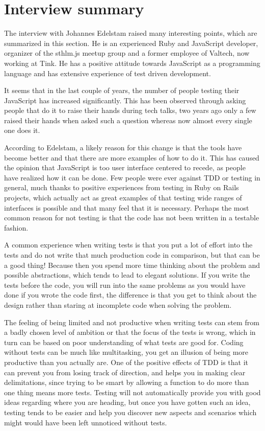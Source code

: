 \documentclass[11pt]{article}
\begin{document}
\section{Interview summary}

The interview with Johannes Edelstam raised many interesting points, which are summarized in this section. He is an experienced Ruby and JavaScript developer, organizer of the sthlm.js meetup group and a former employee of Valtech, now working at Tink. He has a positive attitude towards JavaScript as a programming language and has extensive experience of test driven development.

It seems that in the last couple of years, the number of people testing their JavaScript has increased significantly\cite[question~1]{Edelstam}. This has been observed through asking people that do it to raise their hands during tech talks, two years ago only a few raised their hands when asked such a question whereas now almost every single one does it.

According to Edelstam, a likely reason for this change is that the tools have become better and that there are more examples of how to do it. This has caused the opinion that JavaScript is too user interface centered to recede, as people have realized how it can be done. Few people were ever against TDD or testing in general, much thanks to positive experiences from testing in Ruby on Rails projects, which actually act as great examples of that testing wide ranges of interfaces is possible and that many feel that it is necessary. Perhaps the most common reason for not testing is that the code has not been written in a testable fashion. \cite[questions~2-3]{Edelstam}

A common experience when writing tests is that you put a lot of effort into the tests and do not write that much production code in comparison, but that can be a good thing! Because then you spend more time thinking about the problem and possible abstractions, which tends to lead to elegant solutions. If you write the tests before the code, you will run into the same problems as you would have done if you wrote the code first, the difference is that you get to think about the design rather than staring at incomplete code when solving the problem. \cite[question~8]{Edelstam}

The feeling of being limited and not productive when writing tests can stem from a badly chosen level of ambition or that the focus of the tests is wrong, which in turn can be based on poor understanding of what tests are good for. Coding without tests can be much like multitasking, you get an illusion of being more productive than you actually are. One of the positive effects of TDD is that it can prevent you from losing track of direction, and helps you in making clear delimitations, since trying to be smart by allowing a function to do more than one thing means more tests. Testing will not automatically provide you with good ideas regarding where you are heading, but once you have gotten such an idea, testing tends to be easier and help you discover new aspects and scenarios which might would have been left unnoticed without tests. \cite[question~8]{Edelstam}
\end{document}
